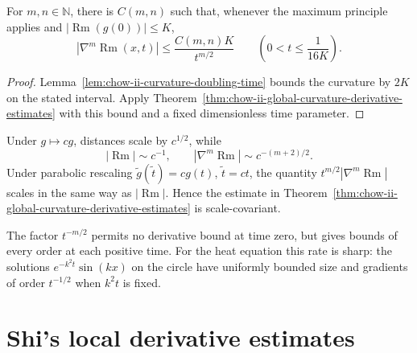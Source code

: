 \begin{corollary}
\label{cor:chow-ii-derivative-estimates-initial-curvature-bound}
For \(m,n\in\mathbb N\), there is \(C(m,n)\) such that, whenever the maximum
principle applies and \(|\operatorname{Rm}(g(0))|\le K\),
\[
|\nabla^m\operatorname{Rm}(x,t)|\le\frac{C(m,n)K}{t^{m/2}}
\qquad\left(0<t\le\frac1{16K}\right).
\]
\end{corollary}
\begin{proof}
Lemma~\ref{lem:chow-ii-curvature-doubling-time} bounds the curvature by
\(2K\) on the stated interval.  Apply
Theorem~\ref{thm:chow-ii-global-curvature-derivative-estimates} with this
bound and a fixed dimensionless time parameter.
\end{proof}

\begin{remark}
\label{rem:chow-ii-curvature-derivative-scaling}
Under \(g\mapsto cg\), distances scale by \(c^{1/2}\), while
\[
|\operatorname{Rm}|\sim c^{-1},\qquad |\nabla^m\operatorname{Rm}|\sim c^{-(m+2)/2}.
\]
Under parabolic rescaling \(\widetilde g(\widetilde t)=cg(t)\),
\(\widetilde t=ct\), the quantity
\(t^{m/2}|\nabla^m\operatorname{Rm}|\) scales in the same way as \(|\operatorname{Rm}|\).  Hence the
estimate in Theorem~\ref{thm:chow-ii-global-curvature-derivative-estimates}
is scale-covariant.
\end{remark}

\begin{remark}
\label{rem:chow-ii-derivative-estimates-smoothing}
The factor \(t^{-m/2}\) permits no derivative bound at time zero, but gives
bounds of every order at each positive time.  For the heat equation this rate
is sharp: the solutions \(e^{-k^2t}\sin(kx)\) on the circle have uniformly
bounded size and gradients of order \(t^{-1/2}\) when \(k^2t\) is fixed.
\end{remark}

\section{Shi's local derivative estimates}


